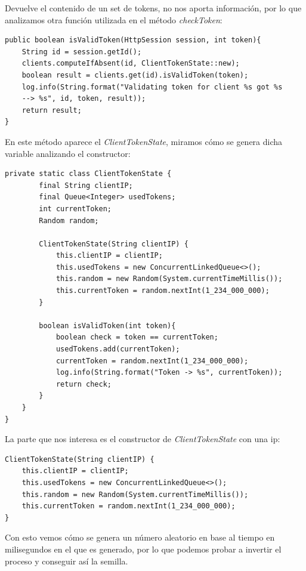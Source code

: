 \documentclass[12pt, a4paper,twoside,titlepage]{article}
\begin{document}
Devuelve el contenido de un set de tokens, no nos aporta información, por lo que analizamos otra función utilizada en el método \emph{checkToken}:

\begin{verbatim}
public boolean isValidToken(HttpSession session, int token){
    String id = session.getId();
    clients.computeIfAbsent(id, ClientTokenState::new);
    boolean result = clients.get(id).isValidToken(token);
    log.info(String.format("Validating token for client %s got %s 
    --> %s", id, token, result));
    return result;
}
\end{verbatim}

En este método aparece el \emph{ClientTokenState}, miramos cómo se genera dicha variable analizando el constructor:

\begin{verbatim}
private static class ClientTokenState {
        final String clientIP;
        final Queue<Integer> usedTokens;
        int currentToken;
        Random random;

        ClientTokenState(String clientIP) {
            this.clientIP = clientIP;
            this.usedTokens = new ConcurrentLinkedQueue<>();
            this.random = new Random(System.currentTimeMillis());
            this.currentToken = random.nextInt(1_234_000_000);
        }

        boolean isValidToken(int token){
            boolean check = token == currentToken;
            usedTokens.add(currentToken);
            currentToken = random.nextInt(1_234_000_000);
            log.info(String.format("Token -> %s", currentToken));
            return check;
        }
    }
}
\end{verbatim}

La parte que nos interesa es el constructor de \emph{ClientTokenState} con una ip:

\begin{verbatim}
ClientTokenState(String clientIP) {
    this.clientIP = clientIP;
    this.usedTokens = new ConcurrentLinkedQueue<>();
    this.random = new Random(System.currentTimeMillis());
    this.currentToken = random.nextInt(1_234_000_000);
}
\end{verbatim}

Con esto vemos cómo se genera un número aleatorio en base al tiempo en milisegundos en el que es generado, por lo que podemos probar a invertir el proceso y conseguir así la semilla.\\
\end{document}
